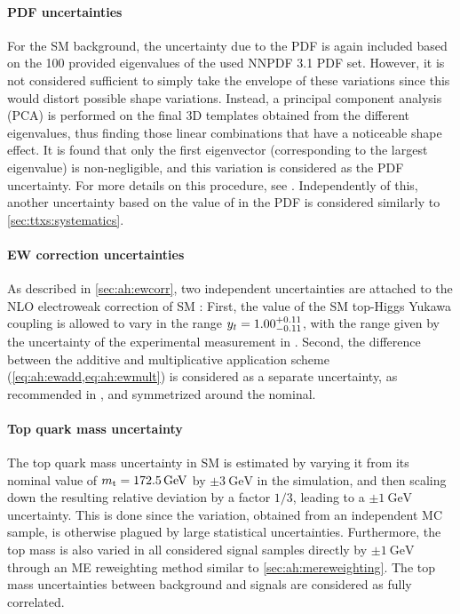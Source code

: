 \paragraph{PDF uncertainties}
For the SM \ttbar background, the uncertainty due to the PDF is again included based on the 100 provided eigenvalues of the used NNPDF 3.1 PDF set. However, it is not considered sufficient to simply take the envelope of these variations since this would distort possible shape variations. Instead, a principal component analysis (PCA) is performed on the final 3D \mttchelchan templates obtained from the different eigenvalues, thus finding those linear combinations that have a noticeable shape effect. It is found that only the first eigenvector (corresponding to the largest eigenvalue) is non-negligible, and this variation is considered as the PDF uncertainty. For more details on this procedure, see . Independently of this, another uncertainty based on the value of \alphas in the PDF is considered similarly to \cref{sec:ttxs:systematics}.

\paragraph{EW correction uncertainties}
As described in \cref{sec:ah:ewcorr}, two independent uncertainties are attached to the NLO electroweak correction of SM {\ttbar}: First, the value of the SM top-Higgs Yukawa coupling is allowed to vary in the range $y_t = {1.00}^{+0.11}_{-0.11}$, with the range given by the uncertainty of the experimental measurement in . Second, the difference between the additive and multiplicative application scheme (\cref{eq:ah:ewadd,eq:ah:ewmult}) is considered as a separate uncertainty, as recommended in , and symmetrized around the nominal.

\paragraph{Top quark mass uncertainty}
The top quark mass uncertainty in SM \ttbar is estimated by varying it from its nominal value of $\mt = \SI{172.5}{\GeV}$ by $\pm \SI{3}{\GeV}$ in the \powheg simulation, and then scaling down the resulting relative deviation by a factor $1/3$, leading to a $\pm \SI{1}{\GeV}$ uncertainty. This is done since the variation, obtained from an independent MC sample, is otherwise plagued by large statistical uncertainties. Furthermore, the top mass is also varied in all considered signal samples directly by $\pm \SI{1}{\GeV}$ through an ME reweighting method similar to \cref{sec:ah:mereweighting}. The top mass uncertainties between background and signals are considered as fully correlated.

